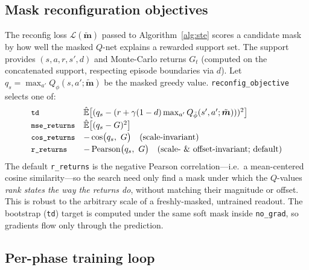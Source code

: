 \documentclass[11pt]{article}
\newcommand{\Ehat}{\hat{\mathbb{E}}}
\newcommand{\obs}{s}
\newcommand{\act}{a}
\newcommand{\masksoft}{\tilde{\bm{m}}}     %
\newcommand{\code}[1]{\texttt{\small #1}}
\begin{document}
\subsection{Mask reconfiguration objectives}
\label{sec:dqn-recon}

The reconfig loss $\mathcal L(\masksoft)$ passed to Algorithm~\ref{alg:ste} scores
a candidate mask by how well the masked $Q$-net explains a rewarded support set.
The support provides $(\obs,\act,r,\obs',d)$ and Monte-Carlo returns $G_t$
(computed on the concatenated support, respecting episode boundaries via $d$).
Let $q_{\obs} = \max_{\act'} Q_\phi(\obs,\act';\masksoft)$ be the masked greedy
value. \code{reconfig\_objective} selects one of:
\[
\begin{array}{ll}
\text{\code{td}} & \Ehat\bigl[(q_\obs - (r+\gamma(1-d)\max_{\act'}Q_{\bar\phi}(\obs',\act';\masksoft)))^2\bigr]\\[2pt]
\text{\code{mse\_returns}} & \Ehat\bigl[(q_\obs - G)^2\bigr]\\[2pt]
\text{\code{cos\_returns}} & -\cos\bigl(q_\obs,\ G\bigr)\quad\text{(scale-invariant)}\\[2pt]
\text{\code{r\_returns}} & -\operatorname{Pearson}\bigl(q_\obs,\ G\bigr)\quad\text{(scale- \& offset-invariant; default)}
\end{array}
\]
The default \code{r\_returns} is the negative Pearson correlation---i.e.\ a
mean-centered cosine similarity---so the search need only find a mask under which
the $Q$-values \emph{rank states the way the returns do}, without matching their
magnitude or offset. This is robust to the arbitrary scale of a freshly-masked,
untrained readout. The bootstrap (\code{td}) target is computed under the same
soft mask inside \code{no\_grad}, so gradients flow only through the prediction.

\subsection{Per-phase training loop}
\label{sec:dqn-loop}
\end{document}
